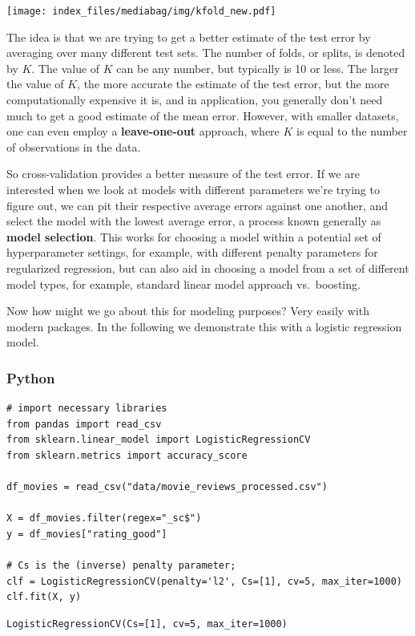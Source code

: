 \documentclass[
  letterpaper,
]{krantz}
\begin{document}
\texttt{[image: index\_files/mediabag/img/kfold\_new.pdf]}

The idea is that we are trying to get a better estimate of the test
error by averaging over many different test sets. The number of folds,
or splits, is denoted by \(K\). The value of \(K\) can be any number,
but typically is 10 or less. The larger the value of \(K\), the more
accurate the estimate of the test error, but the more computationally
expensive it is, and in application, you generally don't need much to
get a good estimate of the mean error. However, with smaller datasets,
one can even employ a \textbf{leave-one-out} approach, where \(K\) is
equal to the number of observations in the data.

So cross-validation provides a better measure of the test error. If we
are interested when we look at models with different parameters we're
trying to figure out, we can pit their respective average errors against
one another, and select the model with the lowest average error, a
process known generally as \textbf{model selection}. This works for
choosing a model within a potential set of hyperparameter settings, for
example, with different penalty parameters for regularized regression,
but can also aid in choosing a model from a set of different model
types, for example, standard linear model approach vs.~boosting.

Now how might we go about this for modeling purposes? Very easily with
modern packages. In the following we demonstrate this with a logistic
regression model.

\subsubsection{Python}

\begin{verbatim}
# import necessary libraries
from pandas import read_csv
from sklearn.linear_model import LogisticRegressionCV
from sklearn.metrics import accuracy_score

df_movies = read_csv("data/movie_reviews_processed.csv")

X = df_movies.filter(regex="_sc$")
y = df_movies["rating_good"]

# Cs is the (inverse) penalty parameter;
clf = LogisticRegressionCV(penalty='l2', Cs=[1], cv=5, max_iter=1000)
clf.fit(X, y)
\end{verbatim}

\begin{verbatim}
LogisticRegressionCV(Cs=[1], cv=5, max_iter=1000)
\end{verbatim}
\end{document}
